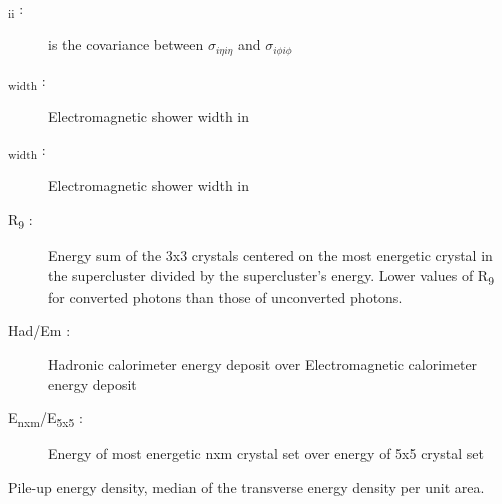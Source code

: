 \begin{description}
\begin{description}
		\item [\textsigma\textsubscript{i\texteta i\textphi} :] is the covariance between $ \sigma_{i \eta i \eta}$ and $ \sigma_{i \phi i \phi}$
    \\
		\item [\texteta\textsubscript{width} \: \textgamma :] Electromagnetic shower width in \texteta
    \item [\textphi\textsubscript{width} \: \textgamma :] Electromagnetic shower width in \textphi
	\item [R\textsubscript{9} \: \textgamma :] Energy sum of the 3x3 crystals centered on the most energetic crystal in
    the supercluster divided by the supercluster's energy. Lower values of R\textsubscript{9} for converted photons than those of unconverted photons.
	\item [Had/Em :] Hadronic calorimeter energy deposit over Electromagnetic calorimeter energy deposit
    \item [E\textsubscript{nxm}/E\textsubscript{5x5} :] Energy of most energetic nxm crystal set over energy of 5x5 crystal set
    \end{description}
    \item [\textrho :] Pile-up energy density, median of the transverse energy density per unit area.
\end{description}

